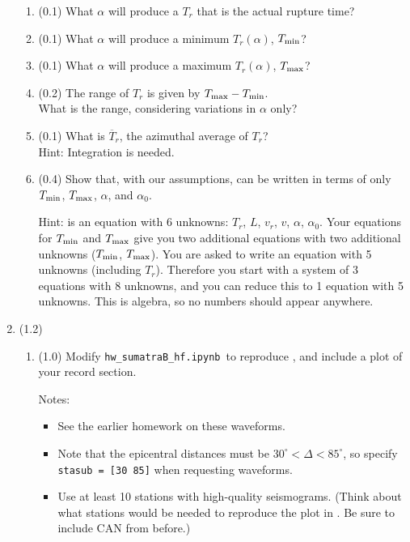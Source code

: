 \documentclass[11pt,titlepage,fleqn]{article}
\newcommand{\tfilehf}{{\tt hw\_sumatraB\_hf.ipynb}}
\begin{document}
\begin{enumerate}
\begin{enumerate}
\item (0.1) What $\alpha$ will produce a $T_r$ that is the actual rupture time?
\item (0.1) What $\alpha$ will produce a minimum $T_r(\alpha)$, $T_{\rm min}$?
\item (0.1) What $\alpha$ will produce a maximum $T_r(\alpha)$, $T_{\rm max}$?
\item (0.2) The range of $T_r$ is given by $T_{\rm max} - T_{\rm min}$. \\
What is the range, considering variations in $\alpha$ only?
\item (0.1) What is $\overline{T}_r$, the azimuthal average of $T_r$? \\
Hint: Integration is needed.
\item (0.4) Show that, with our assumptions,  can be written in terms of only $T_{\rm min}$, $T_{\rm max}$, $\alpha$, and $\alpha_0$.

Hint:  is an equation with 6 unknowns: $T_r$, $L$, $v_r$, $v$, $\alpha$, $\alpha_0$. Your equations for $T_{\rm min}$ and $T_{\rm max}$ give you two additional equations with two additional unknowns ($T_{\rm min}$, $T_{\rm max}$). You are asked to write an equation with 5 unknowns (including $T_r$). Therefore you start with a system of 3 equations with 8 unknowns, and you can reduce this to 1 equation with 5 unknowns. This is algebra, so no numbers should appear anywhere.

\end{enumerate}


\item (1.2) 
\begin{enumerate}
\item (1.0) Modify \tfilehf\ to reproduce \citet[][Figure~1d]{Ni2005}, and include a plot of your record section.

Notes:
%
\begin{itemize}
\item See the earlier homework on these waveforms.

\item Note that the epicentral distances must be $30^\circ < \Delta < 85^\circ$, so specify \\
\verb+stasub = [30 85]+ when requesting waveforms.

\item Use at least 10 stations with high-quality seismograms. (Think about what stations would be needed to reproduce the plot in \citet{Ni2005}. Be sure to include CAN from before.)


\end{itemize}
\end{enumerate}
\end{enumerate}
\end{document}

